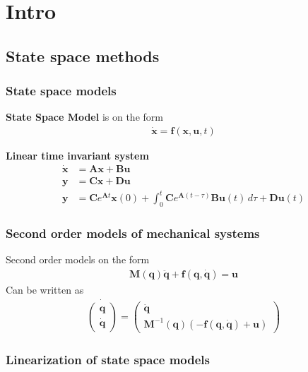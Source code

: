 \section{Intro}

\setcounter{subsection}{1}
\subsection{State space methods}
\subsubsection{State space models} %
\textbf{State Space Model} is on the form
\begin{align*}
    \dot{\bm{x}} = \bm{f}(\bm{x},\bm{u},t)
\end{align*}

\textbf{Linear time invariant system}
\begin{align*}
    \dot{\bm{x}} &= \bm{Ax}+\bm{Bu} \\
    \bm{y} &= \bm{Cx + Du} \\
    \bm{y} &= \bm{C}e^{\bm{A}t}\bm{x}(0) + \int_0^t\bm{C}e^{\bm{A}(t-\tau)}\bm{B}\bm{u}(t)\,d\tau+\bm{D}\bm{u}(t)
\end{align*}

\subsubsection{Second order models of mechanical systems} %
Second order models on the form
\begin{align*}
    \bm{M}(\bm{q})\bm{\ddot{q}} + \bm{f}(\bm{q},\bm{\dot{q}}) = \bm{u}
\end{align*}
Can be written as
\begin{align*}
    \dot{\begin{pmatrix}
        \bm{q} \\ \bm{\dot{q}}
    \end{pmatrix}} = \begin{pmatrix}
        \bm{\dot{q}} \\  \bm{M}^{-1}(\bm{q})(-\bm{f}(\bm{q},\bm{\dot{q}})+\bm{u})
    \end{pmatrix}
\end{align*}
\subsubsection{Linearization of state space models} %

